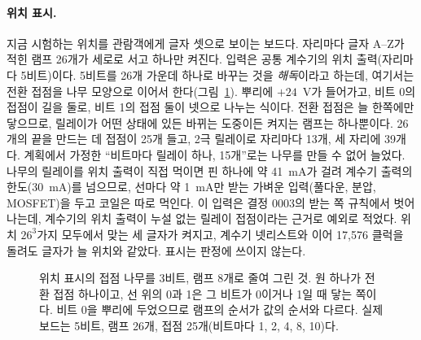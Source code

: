 \paragraph{위치 표시.} 지금 시험하는 위치를 관람객에게 글자 셋으로 보이는 보드다. 자리마다 글자 A--Z가 적힌 램프 26개가
세로로 서고 하나만 켜진다. 입력은 공통 계수기의 위치 출력(자리마다 5비트)이다. 5비트를 26개 가운데 하나로 바꾸는 것을
\emph{해독}이라고 하는데, 여기서는 전환 접점을 나무 모양으로 이어서 한다(그림~\ref{fig:hw-posdisplay-tree}). 뿌리에 $+24$~V가
들어가고, 비트 0의 접점이 길을 둘로, 비트 1의 접점 둘이 넷으로 나누는 식이다. 전환 접점은 늘 한쪽에만 닿으므로, 릴레이가
어떤 상태에 있든 바뀌는 도중이든 켜지는 램프는 하나뿐이다. 26개의 끝을 만드는 데 접점이 25개 들고, 2극 릴레이로 자리마다
13개, 세 자리에 39개다. 계획에서 가정한 ``비트마다 릴레이 하나, 15개''로는 나무를 만들 수 없어 늘었다. 나무의 릴레이를
위치 출력이 직접 먹이면 핀 하나에 약 41~mA가 걸려 계수기 출력의 한도(30~mA)를 넘으므로, 선마다 약 1~mA만 받는 가벼운
입력(풀다운, 분압, MOSFET)을 두고 코일은 따로 먹인다. 이 입력은 결정 0003의 받는 쪽 규칙에서 벗어나는데, 계수기의 위치
출력이 누설 없는 릴레이 접점이라는 근거로 예외로 적었다. 위치 $26^3$가지 모두에서 맞는 세 글자가 켜지고, 계수기
넷리스트와 이어 17,576 클럭을 돌려도 글자가 늘 위치와 같았다. 표시는 판정에 쓰이지 않는다.

\begin{figure}[ht]
\centering

\caption{위치 표시의 접점 나무를 3비트, 램프 8개로 줄여 그린 것. 원 하나가 전환 접점 하나이고, 선 위의 0과 1은 그 비트가
0이거나 1일 때 닿는 쪽이다. 비트 0을 뿌리에 두었으므로 램프의 순서가 값의 순서와 다르다. 실제 보드는 5비트, 램프 26개,
접점 25개(비트마다 1, 2, 4, 8, 10)다.}
\label{fig:hw-posdisplay-tree}
\end{figure}

